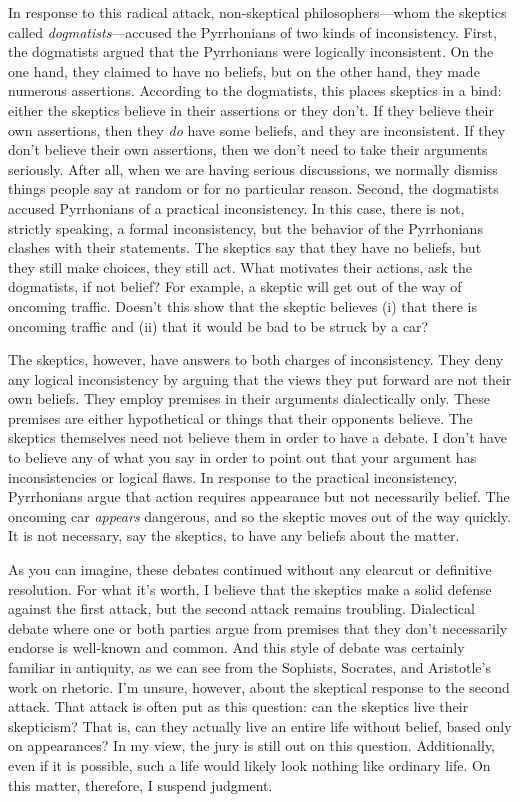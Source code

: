 In response to this radical attack, non-skeptical philosophers---whom the skeptics called \textit{dogmatists}---accused the Pyrrhonians of two kinds of inconsistency. First, the dogmatists argued that the Pyrrhonians were logically inconsistent. On the one hand, they claimed to have no beliefs, but on the other hand, they made numerous assertions. According to the dogmatists, this places skeptics in a bind: either the skeptics believe in their assertions or they don't. If they believe their own assertions, then they \textit{do} have some beliefs, and they are inconsistent. If they don't believe their own assertions, then we don't need to take their arguments seriously. After all, when we are having serious discussions, we normally dismiss things people say at random or for no particular reason. Second, the dogmatists accused Pyrrhonians of a practical inconsistency. In this case, there is not, strictly speaking, a formal inconsistency, but the behavior of the Pyrrhonians clashes with their statements. The skeptics say that they have no beliefs, but they still make choices, they still act. What motivates their actions, ask the dogmatists, if not belief? For example, a skeptic will get out of the way of oncoming traffic. Doesn't this show that the skeptic believes (i) that there is oncoming traffic and (ii) that it would be bad to be struck by a car?

The skeptics, however, have answers to both charges of inconsistency. They deny any logical inconsistency by arguing that the views they put forward are not their own beliefs. They employ premises in their arguments dialectically only. These premises are either hypothetical or things that their opponents believe. The skeptics themselves need not believe them in order to have a debate. I don't have to believe any of what you say in order to point out that your argument has inconsistencies or logical flaws. In response to the practical inconsistency, Pyrrhonians argue that action requires appearance but not necessarily belief. The oncoming car \textit{appears} dangerous, and so the skeptic moves out of the way quickly. It is not necessary, say the skeptics, to have any beliefs about the matter.

As you can imagine, these debates continued without any clearcut or definitive resolution. For what it's worth, I believe that the skeptics make a solid defense against the first attack, but the second attack remains troubling. Dialectical debate where one or both parties argue from premises that they don't necessarily endorse is well-known and common. And this style of debate was certainly familiar in antiquity, as we can see from the Sophists, Socrates, and Aristotle's work on rhetoric. I'm unsure, however, about the skeptical response to the second attack. That attack is often put as this question: can the skeptics live their skepticism? That is, can they actually live an entire life without belief, based only on appearances? In my view, the jury is still out on this question. Additionally, even if it is possible, such a life would likely look nothing like ordinary life. On this matter, therefore, I suspend judgment.

